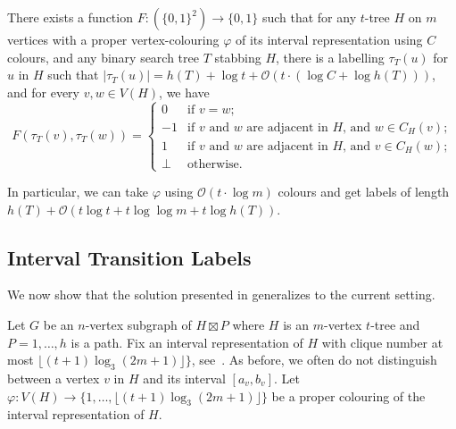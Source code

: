 \documentclass[kpfonts]{patmorin}
\newcommand{\Oh}{\mathcal{O}}
\begin{document}
\begin{lem}
  There exists a function $F:(\{0,1\}^2)\to\{0,1\}$ such that
  for any $t$-tree $H$ on $m$ vertices 
  with a proper vertex-colouring $\varphi$ of its interval representation using $C$ colours,
  and any binary search tree $T$ stabbing $H$,
  there is a labelling $\tau_T(u)$ for $u$ in $H$ such that 
  $|\tau_T(u)| = h(T) + \log t + \Oh(t\cdot(\log C + \log h(T)))$, and
  for every $v,w \in V(H)$, we have
  \[
      F(\tau_{T}(v),\tau_{T}(w)) = \begin{cases}
      0 & \text{if $v=w$;} \\
      -1 & \text{if $v$ and $w$ are adjacent in $H$, and $w\in C_H(v)$;} \\
      1 & \text{if $v$ and $w$ are adjacent in $H$, and $v\in C_H(w)$;} \\
      \perp & \text{otherwise.}
    \end{cases}
  \]
\end{lem}
In particular, we can take $\varphi$ using $\Oh(t\cdot\log m)$ colours and get labels of length 
$h(T)+\Oh(t\log t + t\log\log m + t\log h(T))$.


\subsection{Interval Transition Labels}

We now show that the solution presented in  generalizes to the current setting.


Let $G$ be an $n$-vertex subgraph of $H\boxtimes P$ where $H$ is an $m$-vertex $t$-tree and $P=1,\ldots,h$ is a path. 
Fix an interval representation of $H$ with clique number at most $\lfloor(t+1)\log_3 (2m+1)\rfloor\}$, see~. 
As before, we often do not distinguish between a vertex $v$ in $H$ and its interval $[a_v,b_v]$.
Let $\varphi:V(H)\to\{1,\ldots,\lfloor(t+1)\log_3 (2m+1)\rfloor\}$ be a proper colouring of the interval representation of $H$.
\end{document}
